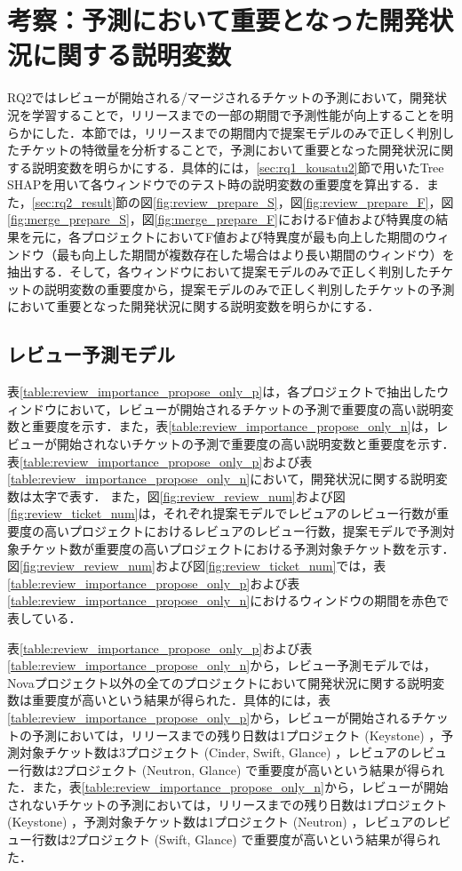 \documentclass[submit]{ipsj}
\begin{document}
\section{考察：予測において重要となった開発状況に関する説明変数}\label{sec:rq2_kousatu}
RQ2ではレビューが開始される/マージされるチケットの予測において，開発状況を学習することで，リリースまでの一部の期間で予測性能が向上することを明らかにした．本節では，リリースまでの期間内で提案モデルのみで正しく判別したチケットの特徴量を分析することで，予測において重要となった開発状況に関する説明変数を明らかにする．具体的には，\ref{sec:rq1_kousatu2}節で用いたTree SHAPを用いて各ウィンドウでのテスト時の説明変数の重要度を算出する．また，\ref{sec:rq2_result}節の図\ref{fig:review_prepare_S}，図\ref{fig:review_prepare_F}，図\ref{fig:merge_prepare_S}，図\ref{fig:merge_prepare_F}におけるF値および特異度の結果を元に，各プロジェクトにおいてF値および特異度が最も向上した期間のウィンドウ（最も向上した期間が複数存在した場合はより長い期間のウィンドウ）を抽出する．そして，各ウィンドウにおいて提案モデルのみで正しく判別したチケットの説明変数の重要度から，提案モデルのみで正しく判別したチケットの予測において重要となった開発状況に関する説明変数を明らかにする．

\subsection{レビュー予測モデル}\label{sec:rq2_kousatu_review}
表\ref{table:review_importance_propose_only_p}は，各プロジェクトで抽出したウィンドウにおいて，レビューが開始されるチケットの予測で重要度の高い説明変数と重要度を示す．また，表\ref{table:review_importance_propose_only_n}は，レビューが開始されないチケットの予測で重要度の高い説明変数と重要度を示す．表\ref{table:review_importance_propose_only_p}および表\ref{table:review_importance_propose_only_n}において，開発状況に関する説明変数は太字で表す．
また，図\ref{fig:review_review_num}および図\ref{fig:review_ticket_num}は，それぞれ提案モデルでレビュアのレビュー行数が重要度の高いプロジェクトにおけるレビュアのレビュー行数，提案モデルで予測対象チケット数が重要度の高いプロジェクトにおける予測対象チケット数を示す．図\ref{fig:review_review_num}および図\ref{fig:review_ticket_num}では，表\ref{table:review_importance_propose_only_p}および表\ref{table:review_importance_propose_only_n}におけるウィンドウの期間を赤色で表している．

表\ref{table:review_importance_propose_only_p}および表\ref{table:review_importance_propose_only_n}から，レビュー予測モデルでは，Novaプロジェクト以外の全てのプロジェクトにおいて開発状況に関する説明変数は重要度が高いという結果が得られた．具体的には，表\ref{table:review_importance_propose_only_p}から，レビューが開始されるチケットの予測においては，リリースまでの残り日数は1プロジェクト (Keystone) ，予測対象チケット数は3プロジェクト (Cinder, Swift, Glance) ，レビュアのレビュー行数は2プロジェクト (Neutron, Glance) で重要度が高いという結果が得られた．また，表\ref{table:review_importance_propose_only_n}から，レビューが開始されないチケットの予測においては，リリースまでの残り日数は1プロジェクト (Keystone) ，予測対象チケット数は1プロジェクト (Neutron) ，レビュアのレビュー行数は2プロジェクト (Swift, Glance) で重要度が高いという結果が得られた．
\end{document}
